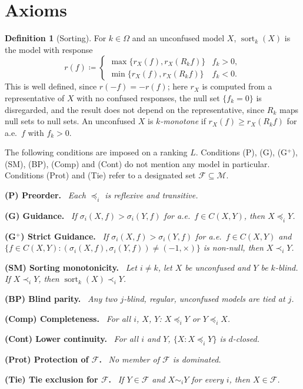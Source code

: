 \documentclass[11pt]{article}
\newcommand{\chg}[1]{{\color{red}#1}}
\theoremstyle{definition}
\newtheorem{definition}[theorem]{Definition}
\theoremstyle{remark}
\newenvironment{axiom}[1]{\par\medskip\noindent\textbf{#1.}\ \itshape}{\par\medskip}
\newcommand{\M}{\mathcal M}
\newcommand{\F}{\mathcal F}
\newcommand{\conf}{\times}
\begin{document}
\section{Axioms}\label{sec:axioms}

\begin{definition}[Sorting]\label{def:sorting}
For $k\in\Omega$ and an unconfused model $X$, $\operatorname{sort}_k(X)$ is the model with response
\[
r(f)\coloneqq\begin{cases}\max\{r_X(f),r_X(R_kf)\}&f_k>0,\\\min\{r_X(f),r_X(R_kf)\}&f_k<0.\end{cases}
\]
This is well defined, since $r(-f)=-r(f)$\chg{; here $r_X$ is computed from a representative of $X$ with no confused responses, the null set $\{f_k=0\}$ is disregarded, and the result does not depend on the representative, since $R_k$ maps null sets to null sets}. An unconfused $X$ is \emph{$k$-monotone} if $r_X(f)\ge r_X(R_kf)$ for a.e.\ $f$ with $f_k>0$.
\end{definition}

The following conditions are imposed on a ranking $L$. Conditions \chg{(P), (G), (G$^+$),} (SM), (BP), (Comp) and (Cont) do not mention any model in particular. Conditions (Prot) and (Tie) refer to a designated set $\F\subseteq\M$.

\begin{axiom}{(P) Preorder}
Each $\preceq_i$ is reflexive and transitive.
\end{axiom}
\begin{axiom}{(G) Guidance}
If $\sigma_i(X,f)>\sigma_i(Y,f)$ for a.e.\ $f\in C(X,Y)$, then $X\preceq_iY$.
\end{axiom}
\begin{axiom}{(G$^+$) Strict Guidance}
\chg{If $\sigma_i(X,f)>\sigma_i(Y,f)$ for a.e.\ $f\in C(X,Y)$ and} $\{f\in C(X,Y):(\sigma_i(X,f),\sigma_i(Y,f))\neq(-1,\conf)\}$ is non-null, then $X\prec_iY$.
\end{axiom}
\begin{axiom}{(SM) Sorting monotonicity}
Let $i\neq k$, let $X$ be unconfused and $Y$ be $k$-blind. If $X\prec_iY$, then $\operatorname{sort}_k(X)\prec_iY$.
\end{axiom}
\begin{axiom}{(BP) Blind parity}
Any two $j$-blind, regular, unconfused models are tied at $j$.
\end{axiom}
\begin{axiom}{(Comp) Completeness}
For all $i$, $X$, $Y$: $X\preceq_iY$ or $Y\preceq_iX$.
\end{axiom}
\begin{axiom}{(Cont) Lower continuity}
For all $i$ and $Y$, $\{X:X\preceq_iY\}$ is $d$-closed.
\end{axiom}
\begin{axiom}{(Prot) Protection of $\F$}
No member of $\F$ is dominated.
\end{axiom}
\begin{axiom}{(Tie) Tie exclusion for $\F$}
If $Y\in\F$ and $X\sim_iY$ for every $i$, then $X\in\F$.
\end{axiom}
\end{document}
